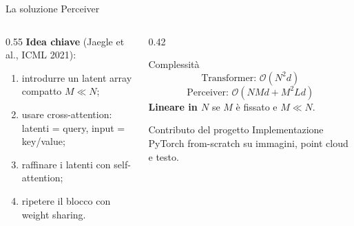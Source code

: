 \documentclass[aspectratio=169,10pt]{beamer}
\newcommand{\bigO}{\mathcal{O}}
\begin{document}
\begin{frame}{La soluzione Perceiver}
\small
\begin{columns}[T]
\begin{column}{0.55\textwidth}
\textbf{Idea chiave} (Jaegle et al., ICML 2021):
\begin{enumerate}
  \item introdurre un \alert{latent array} compatto $M \ll N$;
  \item usare cross-attention: latenti = query, input = key/value;
  \item raffinare i latenti con self-attention;
  \item ripetere il blocco con weight sharing.
\end{enumerate}
\end{column}
\begin{column}{0.42\textwidth}
\begin{block}{Complessità}
\[
\text{Transformer: } \bigO(N^2 d)
\]
\[
\text{Perceiver: } \bigO(NMd + M^2Ld)
\]
\textbf{Lineare in $N$} se $M$ è fissato e $M \ll N$.
\end{block}

\begin{exampleblock}{Contributo del progetto}
Implementazione PyTorch from-scratch su immagini, point cloud e testo.
\end{exampleblock}
\end{column}
\end{columns}
\end{frame}
\end{document}
